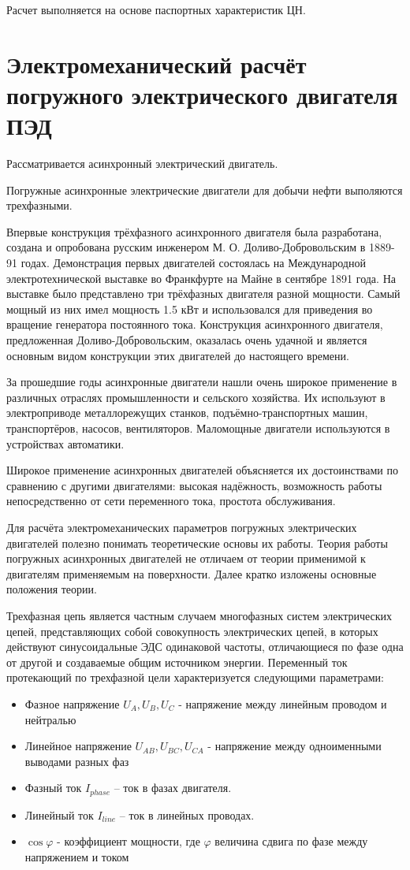 \documentclass[]{scrreprt}
\begin{document}
Расчет выполняется на основе паспортных характеристик ЦН. 

\section{Электромеханический расчёт погружного электрического двигателя ПЭД}
Рассматривается асинхронный электрический двигатель. 

Погружные асинхронные электрические двигатели для добычи нефти выполяются трехфазными. 

Впервые конструкция трёхфазного асинхронного двигателя была разработана, создана и опробована русским инженером М. О. Доливо-Добровольским в 1889-91 годах. Демонстрация первых двигателей состоялась на Международной электротехнической выставке во Франкфурте на Майне в сентябре 1891 года. На выставке было представлено три трёхфазных двигателя разной мощности. Самый мощный из них имел мощность 1.5 кВт и использовался для приведения во вращение генератора постоянного тока. Конструкция асинхронного двигателя, предложенная Доливо-Добровольским, оказалась очень удачной и является основным видом конструкции этих двигателей до настоящего времени.

За прошедшие годы асинхронные двигатели нашли очень широкое применение в различных отраслях промышленности и сельского хозяйства. Их используют в электроприводе металлорежущих станков, подъёмно-транспортных машин, транспортёров, насосов, вентиляторов. Маломощные двигатели используются в устройствах автоматики.

Широкое применение асинхронных двигателей объясняется их достоинствами по сравнению с другими двигателями: высокая надёжность, возможность работы непосредственно от сети переменного тока, простота обслуживания.

Для расчёта электромеханических параметров погружных электрических двигателей полезно понимать теоретические основы их работы. Теория работы погружных асинхронных двигателей не отличаем от теории применимой к двигателям применяемым на поверхности. Далее кратко изложены основные положения теории. 

Трехфазная цепь является частным случаем многофазных систем электрических цепей, представляющих собой совокупность электрических цепей, в которых действуют синусоидальные ЭДС одинаковой частоты, отличающиеся по фазе одна от другой и создаваемые общим источником энергии.
Переменный ток протекающий по трехфазной цели характеризуется следующими параметрами:

\begin{itemize}
	\item Фазное напряжение $U_A, U_B, U_C $ - напряжение между линейным проводом и нейтралью
	\item Линейное напряжение $U_{AB}, U_{BC}, U_{CA} $ - напряжение между одноименными выводами разных фаз
	\item Фазный ток $I_{phase}$ – ток в фазах двигателя.
	\item Линейный ток $I_{line}$ – ток в линейных проводах.
	\item $ \cos \varphi $ - коэффициент мощности, где $ \varphi$ величина сдвига по фазе между напряжением и током 
\end{itemize}
\end{document}
